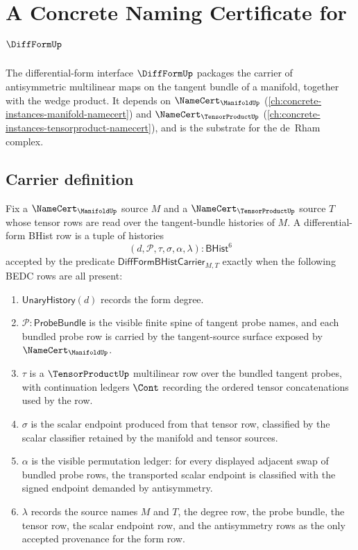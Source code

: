 \chapter{A Concrete Naming Certificate for $\DiffFormUp$}
\label{ch:concrete-instances-diffform-namecert}

The differential-form interface $\DiffFormUp$ packages the carrier of antisymmetric multilinear maps on the tangent bundle of a manifold, together with the wedge product. It depends on $\NameCert_{\ManifoldUp}$ (\autoref{ch:concrete-instances-manifold-namecert}) and $\NameCert_{\TensorProductUp}$ (\autoref{ch:concrete-instances-tensorproduct-namecert}), and is the substrate for the de~Rham complex.

\section{Carrier definition}
\label{sec:diffform-carrier}

\begin{definition}
\label{def:diffform-bhist-form-carrier}
Fix a $\NameCert_{\ManifoldUp}$ source $M$ and a
$\NameCert_{\TensorProductUp}$ source $T$ whose tensor rows are read over the
tangent-bundle histories of $M$. A differential-form BHist row is a tuple of
histories
$$
(d,\mathcal{P},\tau,\sigma,\alpha,\lambda)
:
\mathsf{BHist}^6
$$
accepted by the predicate $\mathsf{DiffFormBHistCarrier}_{M,T}$ exactly when
the following BEDC rows are all present:
\begin{enumerate}
  \item $\mathsf{UnaryHistory}(d)$ records the form degree.
  \item $\mathcal{P}:\mathsf{ProbeBundle}$ is the visible finite spine of tangent
  probe names, and each bundled probe row is carried by the tangent-source
  surface exposed by $\NameCert_{\ManifoldUp}$.
  \item $\tau$ is a $\TensorProductUp$ multilinear row over the bundled
  tangent probes, with continuation ledgers $\Cont$ recording the ordered
  tensor concatenations used by the row.
  \item $\sigma$ is the scalar endpoint produced from that tensor row,
  classified by the scalar classifier retained by the manifold and tensor
  sources.
  \item $\alpha$ is the visible permutation ledger: for every displayed
  adjacent swap of bundled probe rows, the transported scalar endpoint is
  classified with the signed endpoint demanded by antisymmetry.
  \item $\lambda$ records the source names $M$ and $T$, the degree row, the
  probe bundle, the tensor row, the scalar endpoint row, and the antisymmetry
  rows as the only accepted provenance for the form row.
\end{enumerate}
\end{definition}

